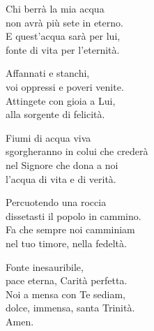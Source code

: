 
\strofa Chi berrà la mia acqua\\
non avrà più sete in eterno.\\
E quest'acqua sarà per lui,\\
fonte di vita per l'eternità.

\spazio

\strofa Affannati e stanchi,\\
voi oppressi e poveri venite.\\
Attingete con gioia a Lui,\\
alla sorgente di felicità.

\spazio

\strofa Fiumi di acqua viva\\
sgorgheranno in colui che crederà\\
nel Signore che dona a noi\\
l'acqua di vita e di verità.

\spazio

\strofa Percuotendo una roccia\\
dissetasti il popolo in cammino.\\
Fa che sempre noi camminiam\\
nel tuo timore, nella fedeltà.

\spazio

\strofa Fonte inesauribile,\\
pace eterna, Carità perfetta.\\
Noi a mensa con Te sediam,\\
dolce, immensa, santa Trinità.\\
Amen.
